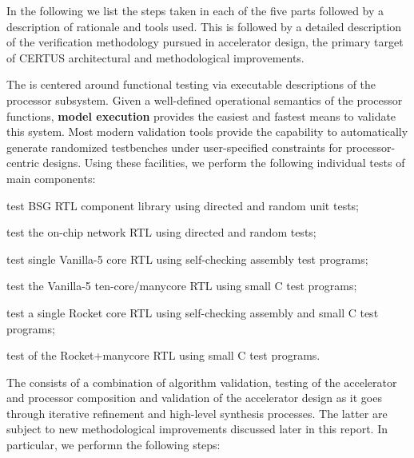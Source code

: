 In the following we list the steps taken in each of the five parts followed by a description of rationale and tools used. This is followed by a detailed description of the verification methodology pursued in accelerator design, the primary target of CERTUS architectural and methodological improvements.

\medskip
\begin{cbxlist}{1.5em}{1em}{1em}

 \item The 
    is centered around functional testing via executable descriptions of the processor subsystem. Given a well-defined operational semantics of the processor functions, {\bf model execution} provides the easiest and fastest means to validate this system. Most modern validation tools provide the capability to automatically generate randomized testbenches under user-specified constraints for processor-centric designs. Using these facilities, we perform the following individual tests of main components:

    \smallskip
    \begin{cbxlist}[--]{1.5em}{0em}{0em}
      \raggedright

      \item test BSG RTL component library using directed and random
         unit tests;
      \item test the on-chip network RTL using directed and random
         tests;

      \item test single Vanilla-5 core RTL using self-checking
         assembly test programs;

      \item test the Vanilla-5 ten-core/manycore RTL using small C
         test programs;

      \item test a single Rocket core RTL using self-checking
         assembly and small C test programs;

      \item test of the Rocket+manycore RTL using small C test programs.

    \end{cbxlist}

 \item The  consists of a combination of algorithm validation, testing of the accelerator and processor composition and validation of the accelerator design as it goes through iterative refinement and high-level synthesis processes. The latter are subject to new methodological improvements discussed later in this report. In particular, we performn the following steps:


\end{cbxlist}
